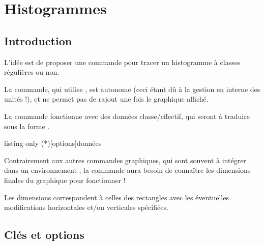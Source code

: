 \newpage

\section{Histogrammes}\label{histo}

\subsection{Introduction}

\begin{tipblock}
 L'idée est de proposer une commande pour tracer un histogramme à classes régulières ou non.

\smallskip

La commande, qui utilise \TikZ, est autonome (ceci étant dû à la gestion en interne des unités !), et ne permet pas de rajout une fois le graphique affiché.
\end{tipblock}

\begin{noteblock}
La commande fonctionne avec des données classe/effectif, qui seront à traduire sous la forme .
\end{noteblock}

\begin{PresCodeTexPL}{listing only}
\Histogramme(*)[options]{données}
\end{PresCodeTexPL}

\begin{PresCodePL}{}
\end{PresCodePL}

\begin{PresCodePL}{}
\end{PresCodePL}

\begin{cautionblock}
Contrairement aux autres commandes graphiques, qui sont souvent à intégrer dans un environnement \TikZ, la commande  aura besoin de connaître les dimensions finales du graphique pour fonctionner !

Les dimensions correspondent à celles des rectangles avec les éventuelles modifications horizontales et/ou verticales spécifiées.
\end{cautionblock}

\subsection{Clés et options}

